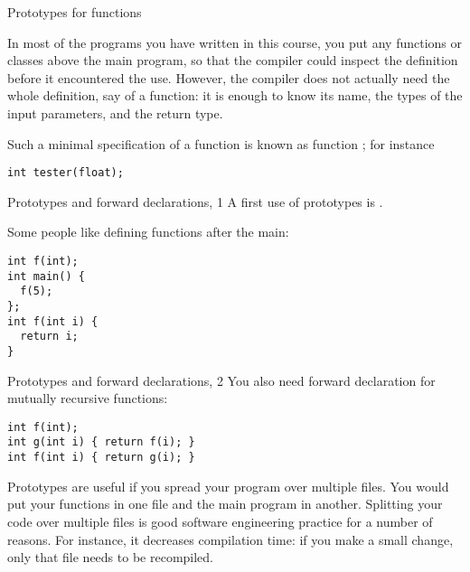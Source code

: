 
 {Prototypes for functions}
\label{sec:proto}

In most of the programs you have written in this course, you put any
functions or classes above the main program, so that the compiler
could inspect the definition before it encountered the use. However,
the compiler does not actually need the whole definition, say of a
function: it is enough to know its name, the types of the input
parameters, and the return type.

Such a minimal specification of a function is known as function
; for instance
\begin{lstlisting}
int tester(float);
\end{lstlisting}

\begin{block}{Prototypes and forward declarations, 1}
  \label{sl:forward-proto1}
  A first use of prototypes is .

  Some people like defining functions after the main:
\begin{lstlisting}
int f(int);
int main() {
  f(5);
};
int f(int i) {
  return i;
}
\end{lstlisting}
\end{block}

\begin{block}{Prototypes and forward declarations, 2}
  \label{sl:forward-proto2}
  You also need forward declaration for mutually recursive functions:
\begin{lstlisting}
int f(int);
int g(int i) { return f(i); }
int f(int i) { return g(i); }
\end{lstlisting}
\end{block}

Prototypes are useful if you spread your program over multiple
files. You would put your functions in one file
and the main program in another. Splitting your code over multiple
files is good software engineering practice for a number of
reasons. For instance, it decreases compilation
time: if you make a small change, only that file needs to be recompiled.

